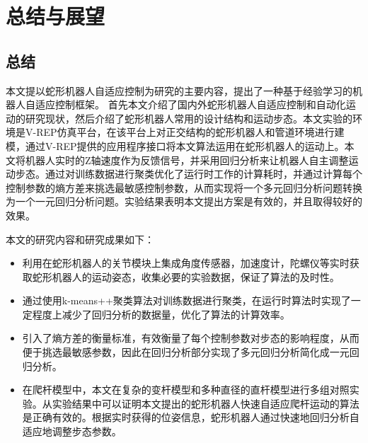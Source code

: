
\chapter{总结与展望}
\section{总结}
本文提以蛇形机器人自适应控制为研究的主要内容，提出了一种基于经验学习的机器人自适应控制框架。 首先本文介绍了国内外蛇形机器人自适应控制和自动化运动的研究现状，然后介绍了蛇形机器人常用的设计结构和运动步态。本文实验的环境是V-REP仿真平台，在该平台上对正交结构的蛇形机器人和管道环境进行建模，通过V-REP提供的应用程序接口将本文算法运用在蛇形机器人的运动上。本文将机器人实时的Z轴速度作为反馈信号，并采用回归分析来让机器人自主调整运动步态。通过对训练数据进行聚类优化了运行时工作的计算耗时，并通过计算每个控制参数的熵方差来挑选最敏感控制参数，从而实现将一个多元回归分析问题转换为一个一元回归分析问题。实验结果表明本文提出方案是有效的，并且取得较好的效果。 

本文的研究内容和研究成果如下：
\begin{itemize}
	\item 利用在蛇形机器人的关节模块上集成角度传感器，加速度计，陀螺仪等实时获取蛇形机器人的运动姿态，收集必要的实验数据，保证了算法的及时性。
	\item 通过使用k-means++聚类算法对训练数据进行聚类，在运行时算法时实现了一定程度上减少了回归分析的数据量，优化了算法的计算效率。
	\item 引入了熵方差的衡量标准，有效衡量了每个控制参数对步态的影响程度，从而便于挑选最敏感参数，因此在回归分析部分实现了多元回归分析简化成一元回归分析。
	\item 在爬杆模型中，本文在复杂的变杆模型和多种直径的直杆模型进行多组对照实验。从实验结果中可以证明本文提出的蛇形机器人快速自适应爬杆运动的算法是正确有效的。根据实时获得的位姿信息，蛇形机器人通过快速地回归分析自适应地调整步态参数。
\end{itemize}

